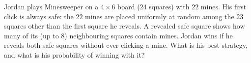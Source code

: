 Jordan plays Minesweeper on a $4\times6$ board ($24$ squares) with $22$ mines. His first click is always safe: the $22$ mines are placed uniformly at random among the $23$ squares other than the first square he reveals. A revealed safe square shows how many of its (up to $8$) neighbouring squares contain mines. Jordan wins if he reveals both safe squares without ever clicking a mine. What is his best strategy, and what is his probability of winning with it?
